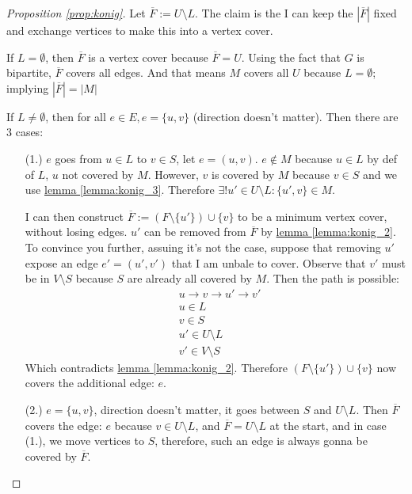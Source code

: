 \documentclass[]{article}
\theoremstyle{definition}
\begin{document}
    \begin{proof}[Proposition \ref*{prop:konig}]
        Let $\overline{F}:= U\setminus L$. The claim is the I can keep the $|\overline{F}|$ fixed and exchange vertices to make this into a vertex cover. 
        \par
        If $L= \emptyset$, then $\overline{F}$ is a vertex cover because $\overline{F} = U$. Using the fact that $G$ is bipartite, $\overline F$ covers all edges. And that means $M$ covers all $U$ because $L=\emptyset$; implying $|\overline{F}| = |M|$
        \par
        If $L\neq \emptyset$, then for all $e\in E, e = \{u, v\}$ (direction doesn't matter). Then there are 3 cases: 
        \begin{enumerate}
            \item [(1.)] $e$ goes from $u\in L$ to $v\in S$, let $e=(u, v)$. $e\not \in M$ because $u\in L$ by def of $L$, $u$ not covered by $M$. However, $v$ is covered by $M$ because $v\in S$ and we use \hyperref[lemma:konig_3]{lemma \ref*{lemma:konig_3}}. Therefore $\exists! u'\in U\setminus L: \{u', v\}\in M$. 
            \par
            I can then construct $\overline{F}:= (F\setminus\{u'\})\cup \{v\}$ to be a minimum vertex cover, without losing edges. $u'$ can be removed from $\overline{F}$ by \hyperref[lemma:konig_2]{lemma \ref*{lemma:konig_2}}. To convince you further, assuing it's not the case, suppose that removing $u'$ expose an edge $e'=(u', v')$ that I am unbale to cover. Observe that $v'$ must be in $V\setminus S$ because $S$ are already all covered by $M$. Then the path is possible: 
            \begin{align}
                & u\rightarrow v\rightarrow u' \rightarrow v'
                \\
                & u\in L
                \\
                & v\in S
                \\
                & u' \in U\setminus L
                \\
                & v'\in V\setminus S
            \end{align}
            Which contradicts \hyperref[lemma:konig_2]{lemma \ref*{lemma:konig_2}}. Therefore $(F\setminus\{u'\})\cup \{v\}$ now covers the additional edge: $e$. 
            \item [(2.)] $e=\{u, v\}$, direction doesn't matter, it goes between $S$ and $U\setminus L$. Then $\overline{F}$ covers the edge: $e$ because $v\in U\setminus L$, and $\overline F = U\setminus L$ at the start, and in case (1.), we move vertices to $S$, therefore, such an edge is always gonna be covered by $\overline F$. 

\end{enumerate}
\end{proof}
\end{document}
